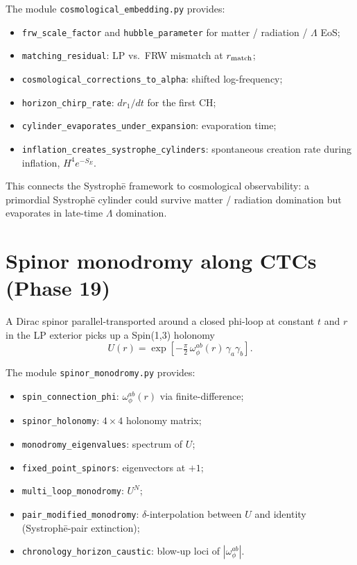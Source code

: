 \documentclass[11pt,a4paper]{article}
\begin{document}
The module \texttt{cosmological\_embedding.py} provides:
\begin{itemize}
\item \texttt{frw\_scale\_factor} and \texttt{hubble\_parameter} for
  matter / radiation / $\Lambda$ EoS;
\item \texttt{matching\_residual}: LP vs.\ FRW mismatch at $r_{\rm match}$;
\item \texttt{cosmological\_corrections\_to\_alpha}: shifted log-frequency;
\item \texttt{horizon\_chirp\_rate}: $dr_1/dt$ for the first CH;
\item \texttt{cylinder\_evaporates\_under\_expansion}: evaporation time;
\item \texttt{inflation\_creates\_systrophe\_cylinders}: spontaneous
  creation rate during inflation, $H^4 e^{-S_E}$.
\end{itemize}

This connects the Systroph\=e framework to cosmological observability:
a primordial Systroph\=e cylinder could survive matter / radiation
domination but evaporates in late-time $\Lambda$ domination.

\section{Spinor monodromy along CTCs (Phase 19)}

A Dirac spinor parallel-transported around a closed phi-loop at
constant $t$ and $r$ in the LP exterior picks up a Spin(1,3)
holonomy
\[
U(r) = \exp\!\left[-\tfrac{\pi}{2}\,\omega^{ab}_{\phi}(r)\,\gamma_a\gamma_b\right].
\]

The module \texttt{spinor\_monodromy.py} provides:
\begin{itemize}
\item \texttt{spin\_connection\_phi}: $\omega^{ab}_{\phi}(r)$ via finite-difference;
\item \texttt{spinor\_holonomy}: $4{\times}4$ holonomy matrix;
\item \texttt{monodromy\_eigenvalues}: spectrum of $U$;
\item \texttt{fixed\_point\_spinors}: eigenvectors at $+1$;
\item \texttt{multi\_loop\_monodromy}: $U^N$;
\item \texttt{pair\_modified\_monodromy}: $\delta$-interpolation
  between $U$ and identity (Systroph\=e-pair extinction);
\item \texttt{chronology\_horizon\_caustic}: blow-up loci of $|\omega^{ab}_\phi|$.
\end{itemize}
\end{document}
